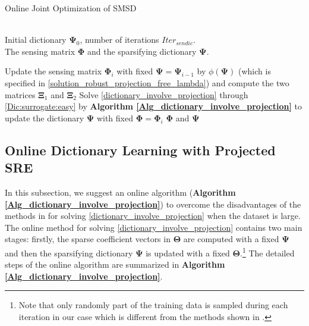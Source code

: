 \documentclass[final,5p,times,twocolumn]{elsarticle}
\begin{document}
\begin{algorithm}[htb]
	\caption{Online Joint Optimization of SMSD}%
	\label{Alg_joint_projection_dictionary}
	\begin{algorithmic}[1]
		\REQUIRE ~\\
		Initial dictionary $\bm\Psi_0$, number of iterations $Iter_{sendic}$.
		\lastcon ~\\          %
		The sensing matrix $\bm\Phi$ and the sparsifying dictionary $\bm\Psi$.
		
		\STATE Update the sensing matrix $\bm\Phi_i$ with fixed $\bm \Psi=\bm\Psi_{i-1}$ by $\phi(\bm \Psi)$ (which is specified in \eqref{solution_robust_projection_free_lambda}) and compute the two matrices $\bm\Xi_1$ and $\bm \Xi_2$
		\STATE Solve \eqref{dictionary_involve_projection} through \eqref{Dic:surrogate:easy} by {\bf Algorithm \ref{Alg_dictionary_involve_projection}} to update the dictionary $\bm\Psi$ with fixed $\bm\Phi=\bm\Phi_i$
		\ENDFOR
		\RETURN $\bm \Phi$ and $\bm\Psi$
	\end{algorithmic}
\end{algorithm}





\subsection{Online Dictionary Learning with Projected SRE}
In this subsection, we suggest an online algorithm ({\bf Algorithm \ref{Alg_dictionary_involve_projection}})  to overcome the disadvantages of the methods in \cite{DCS09,BLLLJC15} for solving \eqref{dictionary_involve_projection} when the dataset is large. The online method for solving \eqref{dictionary_involve_projection} contains two main stages: firstly, the sparse coefficient vectors in $\bm\Theta$ are computed with a fixed $\bm\Psi$ and then the sparsifying dictionary $\bm\Psi$ is updated with a fixed $\bm\Theta$.\footnote{Note that only randomly part of the training data is sampled during each iteration in our case which is different from the methods shown in \cite{DCS09,BLLLJC15}.} The detailed steps of the online algorithm are summarized in {\bf Algorithm \ref{Alg_dictionary_involve_projection}}.
\end{document}
